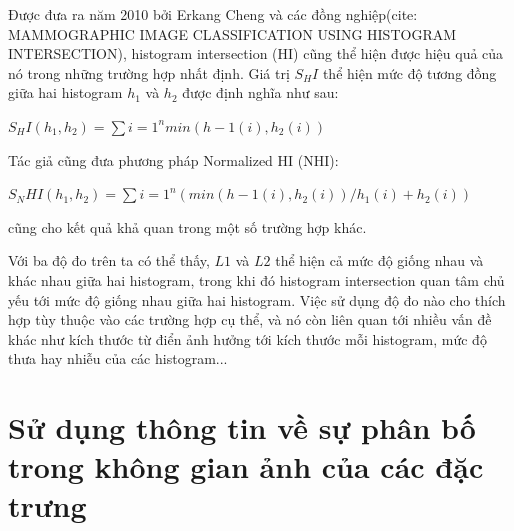 Được đưa ra năm 2010 bởi Erkang Cheng và các đồng nghiệp(cite: MAMMOGRAPHIC IMAGE CLASSIFICATION USING HISTOGRAM INTERSECTION), histogram intersection (HI) cũng thể hiện được hiệu quả của nó trong những trường hợp nhất định. Giá trị $S_HI$ thể hiện mức độ tương đồng giữa hai histogram $h_1$ và $h_2$ được định nghĩa như sau:

$S_HI(h_1, h_2) = \sum\limits{i = 1}^n	min(h-1(i), h_2(i))$

Tác giả cũng đưa phương pháp Normalized HI (NHI):

$S_NHI(h_1, h_2) = \sum\limits{i = 1}^n	(min(h-1(i), h_2(i))/h_1(i) + h_2(i))$

cũng cho kết quả khả quan trong một số trường hợp khác.

Với ba độ đo trên ta có thể thấy, $L1$ và $L2$ thể hiện cả mức độ giống nhau và khác nhau giữa hai histogram, trong khi đó histogram intersection quan tâm chủ yếu tới mức độ giống nhau giữa hai histogram.
Việc sử dụng độ đo nào cho thích hợp tùy thuộc vào các trường hợp cụ thể, và nó còn liên quan tới nhiều vấn đề khác như kích thước từ điển ảnh hưởng tới kích thước mỗi histogram, mức độ thưa hay nhiễu của các histogram...

\section{Sử dụng thông tin về sự phân bố trong không gian ảnh của các đặc trưng}
\label{spatial}

